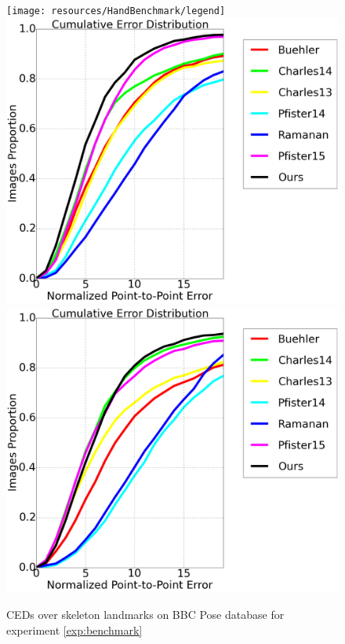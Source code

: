 \begin{figure}[b!]
    \centering
    \texttt{[image: resources/HandBenchmark/legend]}
    \\
    \includegraphics[width=0.48\columnwidth]{resources/HandBenchmark/wrist}
    \includegraphics[width=0.48\columnwidth]{resources/HandBenchmark/elbow}
    \caption{CEDs over skeleton landmarks on BBC Pose database for experiment \ref{exp:benchmark}}
    \label{fig:hand_benchmark}
\end{figure}


